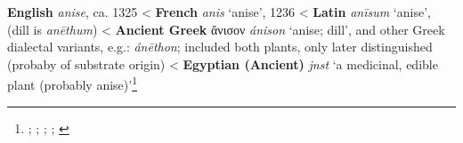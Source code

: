 \begin{etymology}\label{ety:anise}
\textbf{English} \textit{anise}, ca. 1325
< \textbf{French} \textit{anis} `anise', 1236
< \textbf{Latin} \textit{anīsum} `anise', (dill is \textit{anēthum})
< \textbf{Ancient Greek} {ἄνισον} \textit{ánison} `anise; dill', and other Greek dialectal variants, e.g.: \textit{ánēthon}; included both plants, only later distinguished (probaby of substrate origin)
< \textbf{Egyptian (Ancient)} \textit{jnst} `a medicinal, edible plant (probably anise)'\footnote{\textcites[anise]{oed}[anise]{ahd}; \textcite[s.v. anis]{tlfi}; \textcite{lewis_latin_1879}; \textcite{liddell_greek-english_1940}; \textcites[99]{erman_worterbuch_1926}[240]{hemmerdinger_noms_1968}}
\end{etymology}
